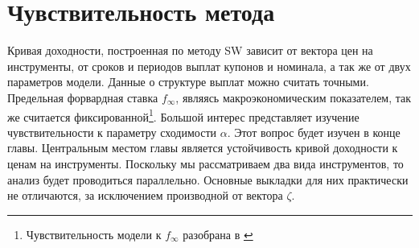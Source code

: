 \documentclass[10pt]{article}
\theoremstyle{definition}
\theoremstyle{remark}
\theoremstyle{plain}
\newcommand{\w}{f_\infty}
\begin{document}
\section{Чувствительность метода}
Кривая доходности, построенная по методу SW зависит от вектора цен на инструменты, от сроков и периодов выплат купонов и номинала, а так же от двух параметров модели. 
Данные о структуре выплат можно считать точными. Предельная форвардная ставка $\w$, являясь макроэкономическим показателем, так же считается фиксированной\footnote{Чувствительность модели к $\w$ разобрана в \cite{Lager}}. Большой интерес представляет изучение чувствительности к параметру сходимости $\alpha$. Этот вопрос будет изучен в конце главы. Центральным местом главы является устойчивость кривой доходности к ценам на инструменты. Поскольку мы рассматриваем два вида инструментов, то анализ будет проводиться параллельно. Основные выкладки для них практически не отличаются, за исключением производной от вектора $\zeta$.
\end{document}
